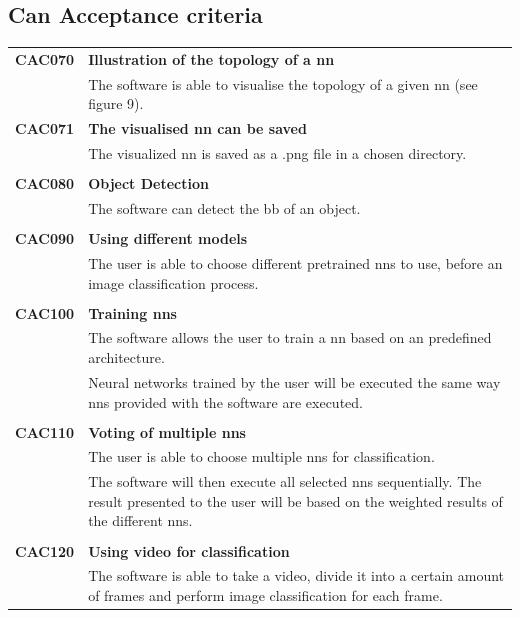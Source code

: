 \documentclass[parskip=full]{scrartcl}
\begin{document}
\subsection{Can Acceptance criteria}
\begin{tabular}{p{2cm}p{11.4cm}}
\textbf{CAC070} \hypertarget{CAC070} & \textbf{Illustration of the topology of a \gls{nn}} \\
& The software is able to visualise the topology of a given \gls{nn} (see figure 9). \\
\textbf{CAC071} \hypertarget{CAC071} & \textbf{The visualised \gls{nn} can be saved}\\
& The visualized \gls{nn} is saved as a .png file in a chosen directory.\\
& \\
\textbf{CAC080} \hypertarget{CAC080} & \textbf{Object Detection} \\
& The software can detect the \gls{bb} of an object. \\ 
& \\
\textbf{CAC090} \hypertarget{CAC090} &  \textbf{Using different models}\\
& The user is able to choose different pretrained \glspl{nn} to use, before an \gls{image classification} process. \\
& \\
\textbf{CAC100} \hypertarget{CAC100} & \textbf{Training \glspl{nn}} \\
& The software allows the user to train a \gls{nn} based on an predefined architecture.\\
& Neural networks trained by the user will be executed the same way \glspl{nn} provided with the software are executed.\\
& \\
\textbf{CAC110} \hypertarget{CAC110} & \textbf{Voting of multiple \glspl{nn}} \\
& The user is able to choose multiple \glspl{nn} for classification.\\
& The software will then execute all selected \glspl{nn} sequentially. The result presented to the user will be based on the weighted results of the different \glspl{nn}.\\
& \\
\textbf{CAC120} \hypertarget{CAC120} & \textbf{Using video for classification} \\
& The software is able to take a video, divide it into a certain amount of frames and perform \gls{image classification} for each frame.\\

\end{tabular}
\end{document}
